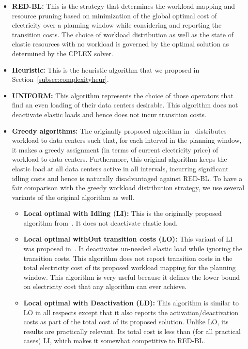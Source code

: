 \begin{itemize}
\item \textbf{RED-BL:} This is the strategy that determines the workload mapping and resource pruning based on minimization of the global optimal cost of electricity over a planning window while considering and reporting the transition costs. The choice of workload distribution as well as the state of elastic resources with no workload is governed by the optimal solution as determined by the CPLEX solver.
\item \textbf{Heuristic:} This is the heuristic algorithm that we proposed in Section~\ref{subsec:complexityheur}.
\item \textbf{UNIFORM:} This algorithm represents the choice of those operators that find an even loading of their data centers desirable. This algorithm does not deactivate elastic loads and hence does not incur transition costs.
\item \textbf{Greedy algorithms:} The originally proposed algorithm in~\cite{qureshi2009cutting} distributes workload to data centers such that, for each interval in the planning window, it makes a greedy assignment (in terms of current electricity price) of workload to data centers. Furthermore, this original algorithm keeps the elastic load at all data centers active in all intervals, incurring significant idling costs and hence is naturally disadvantaged against RED-BL. To have a fair comparison with the greedy workload distribution strategy, we use several variants of the original algorithm as well.
\begin{itemize}
\item \textbf{Local optimal with Idling (LI):} This is the originally proposed algorithm from~\cite{qureshi2009cutting}. It does not deactivate elastic load.
\item \textbf{Local optimal withOut transition costs (LO):} This variant of LI was proposed in~\cite{qureshi2009cutting}. It deactivates un-needed elastic load while ignoring the transition costs. This algorithm does not report transition costs in the total electricity cost of its proposed workload mapping for the planning window. This algorithm is very useful because it defines the lower bound on electricity cost that any algorithm can ever achieve.
\item \textbf{Local optimal with Deactivation (LD):} This algorithm is similar to LO in all respects except that it also reports the activation/deactivation costs as part of the total cost of its proposed solution. Unlike LO, its results are practically relevant. Its total cost is less than (for all practical cases) LI, which makes it somewhat competitive to RED-BL.

\end{itemize}
\end{itemize}

